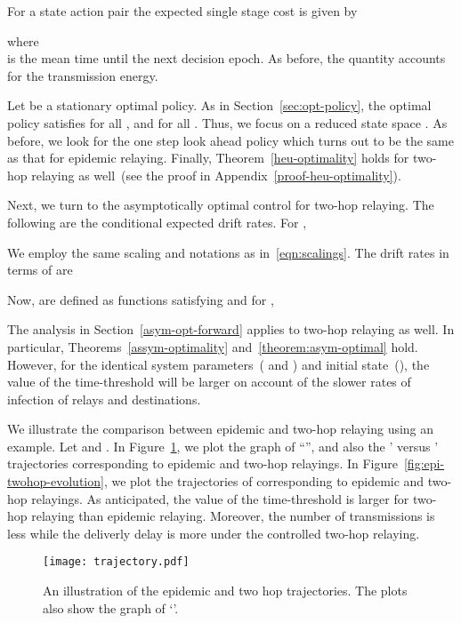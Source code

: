\documentclass[10pt,journal,letterpaper]{IEEEtran}
\begin{document}
For a state action pair 
the expected single stage cost is given by

where \\


 is the mean time until the next decision epoch.
As before, the quantity  accounts for the
transmission energy.

Let  be a stationary optimal policy. As in
Section~\ref{sec:opt-policy}, the optimal policy satisfies
 for all , and
 for all . Thus, we focus on a reduced state space . As before, we look for the one step
look ahead policy which turns out to be the same as that for
epidemic relaying. Finally, Theorem~\ref{heu-optimality} holds for
two-hop relaying as well~(see the proof in
Appendix~\ref{proof-heu-optimality}).

Next, we turn to the asymptotically optimal control for two-hop relaying.
The following are the conditional expected
drift rates. For ,

We employ the same scaling and notations as in~\eqref{eqn:scalings}. The drift rates
in terms of  are

Now,  are defined as functions satisfying  and for
,

The analysis in Section~\ref{asym-opt-forward} applies to two-hop relaying
as well. In particular, Theorems~\ref{assym-optimality} and~\ref{theorem:asym-optimal} hold.
However, for the identical system parameters~( and )
and initial state~(), the value of the time-threshold  will be larger on account of the
slower rates of infection of relays and destinations.


We illustrate the comparison between epidemic and two-hop relaying using an example.
Let 
and . In Figure~\ref{fig:epi-twohop-trajectory}, we plot the
graph of  ``'', and also the ' versus ' trajectories corresponding to
 epidemic and two-hop relayings. In Figure~\ref{fig:epi-twohop-evolution},
we plot the trajectories of  corresponding to
 epidemic and two-hop relayings. As anticipated, the value of the time-threshold  is larger
for two-hop relaying than epidemic relaying. Moreover, the number of transmissions is less while the deliverly delay is more 
under the controlled two-hop relaying. 

\begin{figure}[t]
\centering
\texttt{[image: trajectory.pdf]}
\caption{An illustration of the  epidemic and two hop trajectories.
 The plots also show the graph of  `'.}
\label{fig:epi-twohop-trajectory}
\end{figure}
\end{document}
